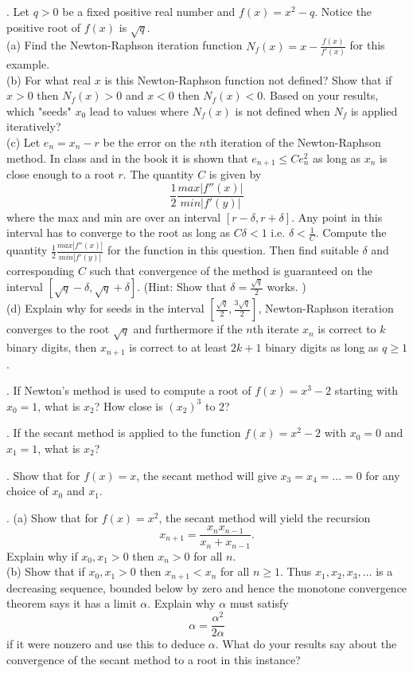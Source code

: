 \documentclass[12 pt]{article}
\begin{document}
. Let $q > 0$ be a fixed positive real number and $f(x)=x^2-q$. Notice the positive root of $f(x)$ is $\sqrt{q}$. \\
(a) Find the Newton-Raphson iteration function $N_f(x) = x - \frac{f(x)}{f'(x)}$ for this example. \\
(b) For what real $x$ is this Newton-Raphson function not defined? Show that if $x > 0$ then $N_f(x) > 0$ and $x<0$ then $N_f(x)<0$. 
Based on your results, which "seeds" $x_0$ lead to values where $N_f(x)$ is not defined when $N_f$ is applied iteratively? \\
(c) Let $e_n=x_n-r$ be the error on the $n$th iteration of the Newton-Raphson method. In class and in the book it is shown that 
$e_{n+1} \leq C e_n^2$ as long as $x_n$ is close enough to a root $r$. The quantity $C$ is given by 
$$
\frac{1}{2} \frac{ max | f''(x) | }{ min |f'(y)|}
$$
where the max and min are over an interval $[r-\delta, r+\delta]$. Any point in this interval has to converge to the root as long 
as $C \delta < 1$ i.e. $\delta < \frac{1}{C}$.  Compute the quantity $\frac{1}{2} \frac{ max |f''(x)|}{min |f'(y)| }$ for the function in this question. 
Then find suitable $\delta$ and corresponding $C$ such that convergence of the method is guaranteed on the interval 
$[\sqrt{q} - \delta, \sqrt{q} + \delta]$. (Hint: Show that $\delta=\frac{\sqrt{q}}{2}$ works. ) \\
(d) Explain why for seeds in the interval $[\frac{\sqrt{q}}{2}, \frac{3\sqrt{q}}{2}]$, Newton-Raphson iteration converges to the root $\sqrt{q}$ 
and furthermore if the $n$th iterate $x_n$ is correct to $k$ binary digits, then $x_{n+1}$ is correct to at least $2k+1$ binary digits as long as 
$q \geq 1$.



\medskip

. If Newton's method is used to compute a root of $f(x)=x^3-2$ starting with $x_0=1$, what is $x_2$? How close is $(x_2)^3$ to $2$?

\medskip

. If the secant method is applied to the function $f(x)=x^2-2$ with $x_0=0$ and $x_1=1$, what is $x_2$?

\medskip

. Show that for $f(x)=x$, the secant method will give $x_3=x_4=\dots = 0$ for any choice of $x_0$ and $x_1$. 

. (a) Show that for $f(x)=x^2$, the secant method will yield the recursion
$$
x_{n+1} = \frac{x_n x_{n-1}}{x_n + x_{n-1}}.
$$
Explain why if $x_0, x_1 > 0$ then $x_n > 0$ for all $n$. \\
(b) Show that if $x_0, x_1 > 0$ then $x_{n+1} < x_n$ for all $n \geq 1$. Thus $x_1, x_2, x_3, \dots$ is a decreasing sequence, bounded below by zero 
and hence the monotone convergence theorem says it has a limit $\alpha$. Explain why $\alpha$ must satisfy 
$$
\alpha = \frac{\alpha^2}{2\alpha}
$$
if it were nonzero and use this to deduce $\alpha$. What do your results say about the convergence of the secant method to a root in this instance?
 
\end{document}
